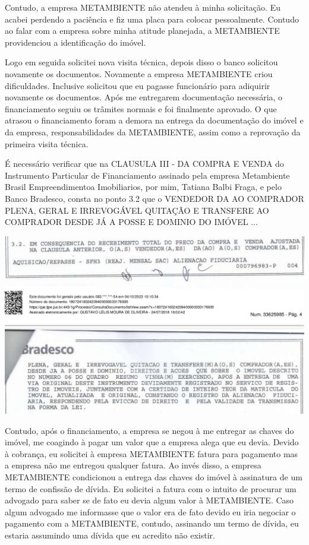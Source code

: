\documentclass[11pt]{letter}
\begin{document}
Contudo, a empresa METAMBIENTE não atendeu à minha solicitação. Eu acabei perdendo a paciência e fiz uma placa para colocar pessoalmente. Contudo ao falar com a empresa sobre minha atitude planejada, a METAMBIENTE providenciou a identificação do imóvel. 

Logo em seguida solicitei nova visita técnica, depois disso o banco solicitou novamente os documentos. Novamente a empresa METAMBIENTE criou dificuldades. Inclusive solicitou que eu pagasse funcionário para adiquirir novamente os documentos. Após me entregarem documentação necessária, o financiamento seguiu os trâmites normais e foi finalmente aprovado. O que atrasou o financiamento foram a demora na entrega da documentação do imóvel e da empresa, responsabilidades da METAMBIENTE, assim como a reprovação da primeira visita técnica. 

É necessário verificar que na CLAUSULA III - DA COMPRA E VENDA do Instrumento Particular de Financiamento assinado pela empresa Metambiente Brasil Empreendimentoa Imobiliarios, por mim, Tatiana Balbi Fraga, e pelo Banco Bradesco,  consta no ponto 3.2 que o VENDEDOR DA AO COMPRADOR PLENA, GERAL E IRREVOGÁVEL QUITAÇÃO E TRANSFERE AO COMPRADOR DESDE JÁ A POSSE E DOMINIO DO IMÓVEL ... 

\includegraphics[width=\textwidth]{doc2.png}

Contudo, após o financiamento, a empresa se negou à me entregar as chaves do imóvel, me coagindo à pagar um valor que a empresa alega que eu devia. Devido à cobrança, eu solicitei à empresa METAMBIENTE fatura para pagamento mas a empresa não me entregou qualquer fatura. Ao invés disso, a empresa METAMBIENTE condicionou a entrega das chaves do imóvel à assinatura de um termo de confissão de dívida. Eu solicitei a fatura com o intuito de procurar um advogado para saber se de fato eu devia algum valor à METAMBIENTE. Caso algum advogado me informasse que o valor era de fato devido eu iria negociar o pagamento com a METAMBIENTE, contudo, assinando um termo de dívida, eu estaria assumindo uma dívida que eu acredito não existir. 
\end{document}
